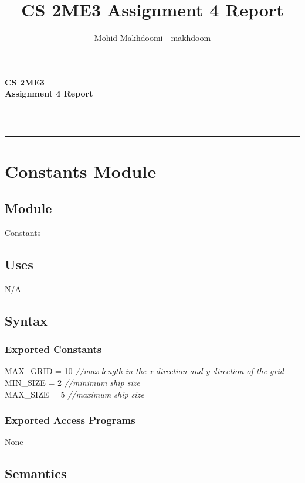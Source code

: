 \documentclass[12pt]{article}
\title{CS 2ME3 Assignment 4 Report}
\author{Mohid Makhdoomi - makhdoom}
\begin{document}
\makeatletter
\vspace*{8em}
\noindent
\hfil\parbox[t]{1\textwidth}{\centering\Huge\bfseries{CS 2ME3}\\[0.5ex]{Assignment 4 Report}}\par
\kern0.6cm \hrule\kern0.4cm
\noindent
\hfil\parbox[t]{1\textwidth}{\centering\large\bfseries\@author\\[2ex]\@date}\par
\kern0.3cm \hrule\kern0cm
\makeatother
\newpage
%
\newpage

\section* {Constants Module}

\subsection*{Module}

Constants

\subsection* {Uses}

N/A

\subsection* {Syntax}

\subsubsection* {Exported Constants}

MAX\_GRID = 10 {\it //max length in the x-direction and y-direction of the grid}\\
MIN\_SIZE = 2 {\it //minimum ship size}\\
MAX\_SIZE = 5 {\it //maximum ship size}

\subsubsection* {Exported Access Programs}

None

\subsection* {Semantics}
\end{document}
